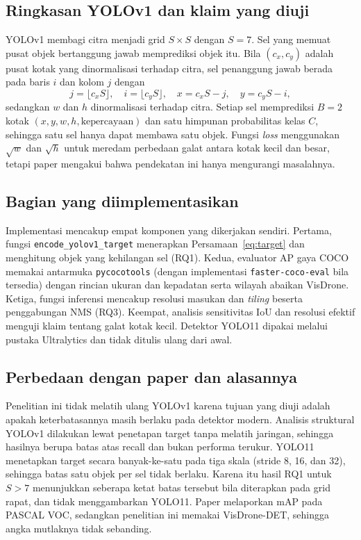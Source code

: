 \subsection{Ringkasan YOLOv1 dan klaim yang diuji}
YOLOv1 membagi citra menjadi grid $S\times S$ dengan $S=7$. Sel yang memuat pusat objek bertanggung jawab memprediksi objek itu. Bila $(c_x,c_y)$ adalah pusat kotak yang dinormalisasi terhadap citra, sel penanggung jawab berada pada baris $i$ dan kolom $j$ dengan
\begin{equation}
j=\lfloor c_x S\rfloor,\quad i=\lfloor c_y S\rfloor,\quad x=c_x S-j,\quad y=c_y S-i,
\label{eq:target}
\end{equation}
sedangkan $w$ dan $h$ dinormalisasi terhadap citra. Setiap sel memprediksi $B=2$ kotak $(x,y,w,h,\text{kepercayaan})$ dan satu himpunan probabilitas kelas $C$, sehingga satu sel hanya dapat membawa satu objek. Fungsi \textit{loss} menggunakan $\sqrt{w}$ dan $\sqrt{h}$ untuk meredam perbedaan galat antara kotak kecil dan besar, tetapi paper mengakui bahwa pendekatan ini hanya mengurangi masalahnya.

\subsection{Bagian yang diimplementasikan}
Implementasi mencakup empat komponen yang dikerjakan sendiri. Pertama, fungsi \texttt{encode\_yolov1\_target} menerapkan Persamaan~\eqref{eq:target} dan menghitung objek yang kehilangan sel (RQ1). Kedua, evaluator AP gaya COCO memakai antarmuka \texttt{pycocotools} (dengan implementasi \texttt{faster-coco-eval} bila tersedia) dengan rincian ukuran dan kepadatan serta wilayah abaikan VisDrone. Ketiga, fungsi inferensi mencakup resolusi masukan dan \textit{tiling} beserta penggabungan NMS (RQ3). Keempat, analisis sensitivitas IoU dan resolusi efektif menguji klaim tentang galat kotak kecil. Detektor YOLO11 dipakai melalui pustaka Ultralytics dan tidak ditulis ulang dari awal.

\subsection{Perbedaan dengan paper dan alasannya}
Penelitian ini tidak melatih ulang YOLOv1 karena tujuan yang diuji adalah apakah keterbatasannya masih berlaku pada detektor modern. Analisis struktural YOLOv1 dilakukan lewat penetapan target tanpa melatih jaringan, sehingga hasilnya berupa batas atas recall dan bukan performa terukur. YOLO11 menetapkan target secara banyak-ke-satu pada tiga skala (stride 8, 16, dan 32), sehingga batas satu objek per sel tidak berlaku. Karena itu hasil RQ1 untuk $S>7$ menunjukkan seberapa ketat batas tersebut bila diterapkan pada grid rapat, dan tidak menggambarkan YOLO11. Paper melaporkan mAP pada PASCAL VOC, sedangkan penelitian ini memakai VisDrone-DET, sehingga angka mutlaknya tidak sebanding.

